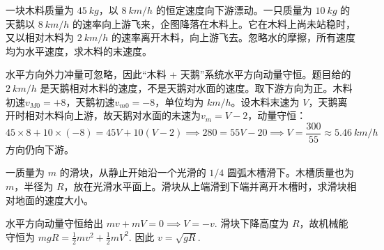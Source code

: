 \begin{exercise}
一块木料质量为 \(\SI{45}{kg}\)，以 \(\SI{8}{km/h}\) 的恒定速度向下游漂动。一只质量为 \(\SI{10}{kg}\) 的天鹅以 \(\SI{8}{km/h}\) 的速率向上游飞来，企图降落在木料上。它在木料上尚未站稳时，又以相对木料为 \(\SI{2}{km/h}\) 的速率离开木料，向上游飞去。忽略水的摩擦，所有速度均为水平速度，求木料的末速度。
\end{exercise}
\begin{solution}
水平方向外力冲量可忽略，因此“木料 + 天鹅”系统水平方向动量守恒。题目给的 \(\SI{2}{km/h}\) 是天鹅相对木料的速度，不是天鹅对水面的速度。取下游方向为正。木料初速$v_{M0}=+8$，天鹅初速$v_{m0}=-8$，单位均为 \(\si{km/h}\)。设木料末速为 \(V\)，天鹅离开时相对木料向上游，故天鹅对水面的末速为$v_m=V-2$，动量守恒：\[45\times 8+10\times(-8)=45V+10(V-2)\implies 280=55V-20\implies V=\frac{300}{55}\approx \SI{5.46}{km/h}\]
方向仍向下游。
\end{solution}

\begin{exercise}
一质量为 \(m\) 的滑块，从静止开始沿一个光滑的 \(1/4\) 圆弧木槽滑下。木槽质量也为 \(m\)，半径为 \(R\)，放在光滑水平面上。滑块从上端滑到下端并离开木槽时，求滑块相对地面的速度大小。
\end{exercise}
\begin{solution}
水平方向动量守恒给出
 \(mv+mV=0\implies V=-v.\) 
滑块下降高度为 \(R\)，故机械能守恒为
 \(mgR=\frac12mv^2+\frac12mV^2.\) 
因此
 \(v=\sqrt{gR}.\) 
\end{solution}

